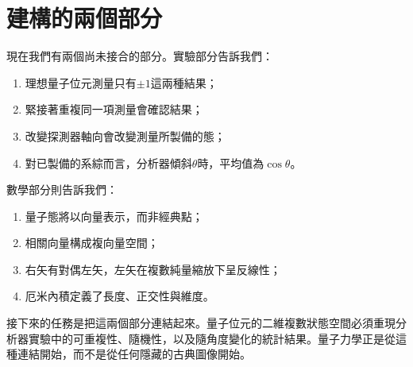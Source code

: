 \begin{classroomqa}
\end{classroomqa}

\section{建構的兩個部分}

現在我們有兩個尚未接合的部分。實驗部分告訴我們：
\begin{enumerate}
  \item 理想量子位元測量只有\(\pm1\)這兩種結果；
  \item 緊接著重複同一項測量會確認結果；
  \item 改變探測器軸向會改變測量所製備的態；
  \item 對已製備的系綜而言，分析器傾斜\(\theta\)時，平均值為\(\cos\theta\)。
\end{enumerate}
數學部分則告訴我們：
\begin{enumerate}
  \item 量子態將以向量表示，而非經典點；
  \item 相關向量構成複向量空間；
  \item 右矢有對偶左矢，左矢在複數純量縮放下呈反線性；
  \item 厄米內積定義了長度、正交性與維度。
\end{enumerate}

接下來的任務是把這兩個部分連結起來。量子位元的二維複數狀態空間必須重現分析器實驗中的可重複性、隨機性，以及隨角度變化的統計結果。量子力學正是從這種連結開始，而不是從任何隱藏的古典圖像開始。
